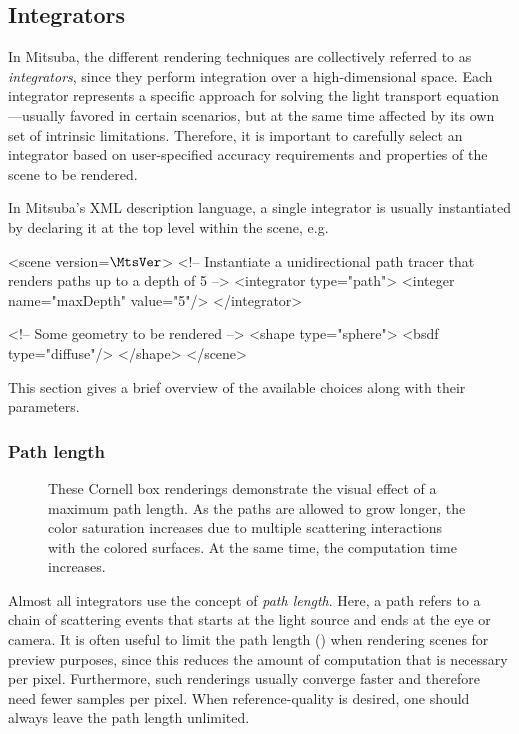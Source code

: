 \newpage
\subsection{Integrators}
\label{sec:integrators}
In Mitsuba, the different rendering techniques are collectively referred to as 
\emph{integrators}, since they perform integration over a high-dimensional
space. Each integrator represents a specific approach for solving
the light transport equation---usually favored in certain scenarios, but
at the same time affected by its own set of intrinsic limitations.
Therefore, it is important to carefully select an integrator based on 
user-specified accuracy requirements and properties of the scene to be 
rendered. 

In Mitsuba's XML description language, a single integrator
is usually instantiated by declaring it at the top level within the
scene, e.g.
\begin{xml}
<scene version=$\MtsVer$>
	<!-- Instantiate a unidirectional path tracer that
	     renders paths up to a depth of 5 -->
	<integrator type="path">
		<integer name="maxDepth" value="5"/>
	</integrator>

	<!-- Some geometry to be rendered -->
	<shape type="sphere">
		<bsdf type="diffuse"/>
	</shape>
</scene>
\end{xml}

This section gives a brief overview of the available choices 
along with their parameters.

\subsubsection*{Path length}
\begin{figure}[htb!]
\centering
\hfill
{}
\caption{
	\label{fig:pathlengths}
	These Cornell box renderings demonstrate the visual 
	effect of a maximum path length. As the paths
	are allowed to grow longer, the color saturation
	increases due to multiple scattering interactions
	with the colored surfaces. At the same time, the
	computation time increases.
}
\end{figure}

Almost all integrators use the concept of \emph{path length}.
Here, a path refers to a chain of scattering events that 
starts at the light source and ends at the eye or camera.
It is often useful to limit the path length () 
when rendering scenes for preview purposes, since this reduces the amount 
of computation that is necessary per pixel. Furthermore, such renderings
usually converge faster and therefore need fewer samples per pixel.
When reference-quality is desired, one should always leave the path 
length unlimited.

